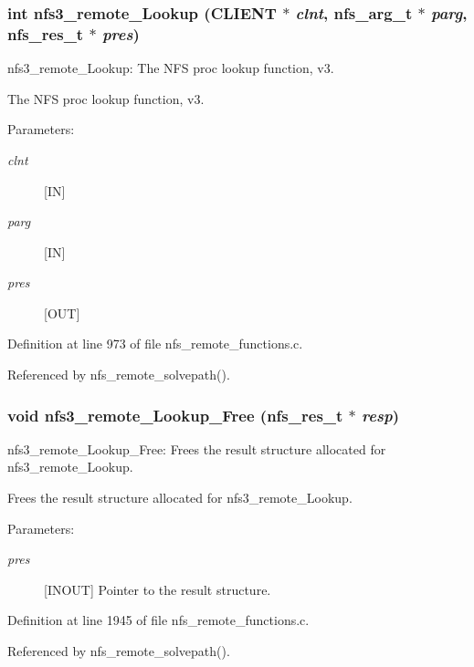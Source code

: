 \subsubsection{\setlength{\rightskip}{0pt plus 5cm}int nfs3\_\-remote\_\-Lookup (CLIENT $\ast$ {\em clnt}, nfs\_\-arg\_\-t $\ast$ {\em parg}, nfs\_\-res\_\-t $\ast$ {\em pres})}\label{group__NFSprocs_ga21}


nfs3\_\-remote\_\-Lookup: The NFS proc lookup function, v3.

The NFS proc lookup function, v3.

\begin{Desc}
\item[Parameters:]
\begin{description}
\item[{\em clnt}][IN] \item[{\em parg}][IN] \item[{\em pres}][OUT] \end{description}
\end{Desc}


Definition at line 973 of file nfs\_\-remote\_\-functions.c.

Referenced by nfs\_\-remote\_\-solvepath().
\subsubsection{\setlength{\rightskip}{0pt plus 5cm}void nfs3\_\-remote\_\-Lookup\_\-Free (nfs\_\-res\_\-t $\ast$ {\em resp})}\label{group__NFSprocs_ga75}


nfs3\_\-remote\_\-Lookup\_\-Free: Frees the result structure allocated for nfs3\_\-remote\_\-Lookup.

Frees the result structure allocated for nfs3\_\-remote\_\-Lookup.

\begin{Desc}
\item[Parameters:]
\begin{description}
\item[{\em pres}][INOUT] Pointer to the result structure. \end{description}
\end{Desc}


Definition at line 1945 of file nfs\_\-remote\_\-functions.c.

Referenced by nfs\_\-remote\_\-solvepath().
